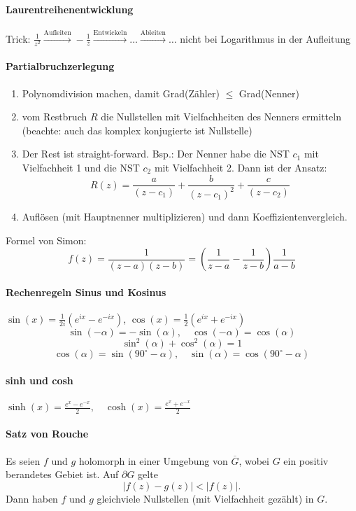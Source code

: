 \documentclass[a4paper, 10pt, DIV20, headings=small]{scrartcl}
\theoremstyle{definition}
\theoremstyle{plain}
\begin{document}
\paragraph{Laurentreihenentwicklung}
Trick: $\frac{1}{z^2} \overset{\text{Aufleiten}}{\rightarrow} -\frac{1}{z} \overset{\text{Entwickeln}}{\rightarrow} \ldots \overset{\text{Ableiten}}{\rightarrow} \ldots$ nicht bei Logarithmus in der Aufleitung

\paragraph{Partialbruchzerlegung}
\begin{enumerate}
\item Polynomdivision machen, damit Grad(Zähler) $\leq$ Grad(Nenner)
\item vom Restbruch $R$ die Nullstellen mit Vielfachheiten des Nenners ermitteln (beachte: auch das komplex konjugierte ist Nullstelle)
\item Der Rest ist straight-forward. Bsp.: Der Nenner habe die NST $c_1$ mit Vielfachheit 1 und die NST $c_2$ mit Vielfachheit 2. Dann ist der Ansatz: $$R(z) = \frac{a}{(z-c_1)} + \frac{b}{(z-c_1)^2} + \frac{c}{(z-c_2)}$$
\item Auflösen (mit Hauptnenner multiplizieren) und dann Koeffizientenvergleich.
\end{enumerate}
Formel von Simon:
$$f(z) = \frac{1}{(z-a)(z-b)} = \left(\frac{1}{z-a} - \frac{1}{z-b}\right) \frac{1}{a-b}$$

\paragraph{Rechenregeln Sinus und Kosinus}
$\sin(x) = \frac{1}{2i} (e^{ix}-e^{-ix})$, $\cos(x) = \frac{1}{2} (e^{ix}+e^{-ix})$
$$\sin(-\alpha) = - \sin(\alpha), \quad \cos(-\alpha) = \cos(\alpha)$$
$$\sin^2(\alpha) + \cos^2(\alpha) = 1$$
$$\cos(\alpha) = \sin(90^\circ - \alpha), \quad \sin(\alpha) = \cos(90^\circ - \alpha)$$

\paragraph{sinh und cosh}
$\sinh(x) = \frac{e^x - e^{-x}}{2}, \quad \cosh(x) = \frac{e^x + e^{-x}}{2}$

\paragraph{Satz von Rouche}
Es seien $f$ und $g$ holomorph in einer Umgebung von $\overline{G}$, wobei $G$ ein positiv berandetes Gebiet ist. Auf $\partial G$ gelte
$$|f(z)-g(z)| < |f(z)|.$$
Dann haben $f$ und $g$ gleichviele Nullstellen (mit Vielfachheit gezählt) in $G$.
\end{document}

